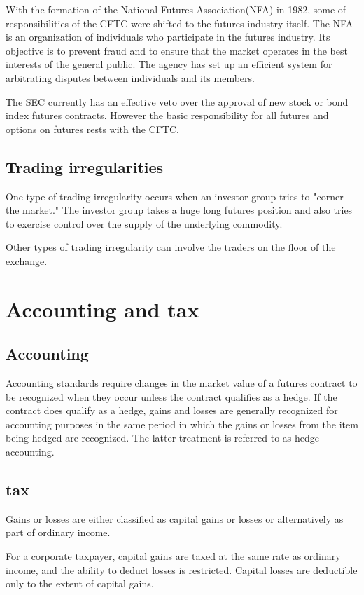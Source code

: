 \documentclass{article}
\begin{document}
With the formation of the National Futures Association(NFA) in 1982, some of responsibilities of the CFTC were shifted to the futures industry itself. The NFA is an organization of individuals who participate in the futures industry. Its objective is to prevent fraud and to ensure that the market operates in the best interests of the general public. The agency has set up an efficient system for arbitrating disputes between individuals and its members.

The SEC currently has an effective veto over the approval of new stock or bond index futures contracts. However the basic responsibility for all futures and options on futures rests with the CFTC.

\subsection{Trading irregularities}
One type of trading irregularity occurs when an investor group tries to "corner the market." The investor group takes a huge long futures position and also tries to exercise control over the supply of the underlying commodity.

Other types of trading irregularity can involve the traders on the floor of the exchange.

\section{Accounting and tax}
\subsection{Accounting }
Accounting standards require changes in the market value of a futures contract to be recognized when they occur unless the contract qualifies as a hedge. If the contract does qualify as a hedge, gains and losses are generally recognized for accounting purposes in the same period in which the gains or losses from the item being hedged are recognized. The latter treatment is referred to as hedge accounting.

\subsection{tax}
Gains or losses are either classified as capital gains or losses or alternatively as part of ordinary income.

For a corporate taxpayer, capital gains are taxed at the same rate as ordinary income, and the ability to deduct losses is restricted. Capital losses are deductible only to the extent of capital gains. 
\end{document}
